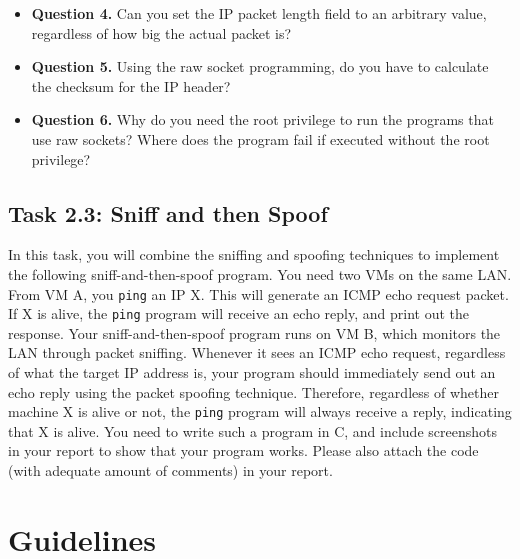 \begin{itemize}
\item \textbf{Question 4.}
Can you set the IP packet length field to an arbitrary value,
regardless of how big the actual packet is? 


\item \textbf{Question 5.} 
Using the raw socket programming, do you have to calculate the 
checksum for the IP header? 

\item \textbf{Question 6.} 
Why do you need the root privilege to run the programs that 
use raw sockets? Where does the program fail if executed without the root 
privilege?

\end{itemize}
 





\subsection{Task 2.3: Sniff and then Spoof}

In this task, you will combine the sniffing and spoofing techniques
to implement the following sniff-and-then-spoof program. 
You need two VMs on the same LAN. From VM A, you 
{\tt ping} an IP X. This will generate an ICMP echo 
request packet. If X is alive, the {\tt ping} program will receive 
an echo reply, and print out the response. Your sniff-and-then-spoof
program runs on VM B, which monitors the LAN through packet sniffing. Whenever it 
sees an ICMP echo request, regardless of what the target IP address is,
your program should immediately send out an echo reply using the 
packet spoofing technique. Therefore, regardless of whether machine X
is alive or not, the {\tt ping} program will always receive 
a reply, indicating that X is alive. You need to write such a program in C, and
include screenshots in your report to show that 
your program works. Please also attach the code (with adequate amount 
of comments) in your report.







\section{Guidelines} 



